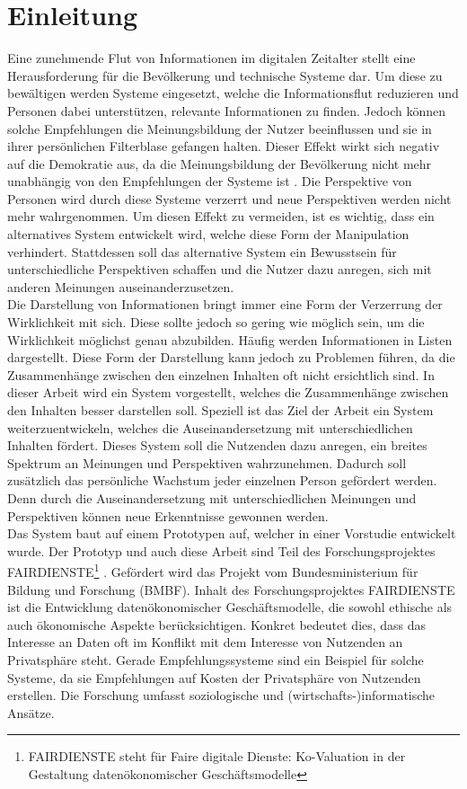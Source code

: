 \section{Einleitung}
Eine zunehmende Flut von Informationen im digitalen Zeitalter stellt eine Herausforderung für die Bevölkerung und technische Systeme dar.
Um diese zu bewältigen werden Systeme eingesetzt, welche die Informationsflut reduzieren und Personen dabei unterstützen, relevante Informationen zu finden.
Jedoch können solche Empfehlungen die Meinungsbildung der Nutzer beeinflussen und sie in ihrer persönlichen \glqq Filterblase\grqq{} gefangen halten.
Dieser Effekt wirkt sich negativ auf die Demokratie aus, da die Meinungsbildung der Bevölkerung nicht mehr unabhängig von den Empfehlungen der Systeme ist \cite{breaking-filter-bubble}.
Die Perspektive von Personen wird durch diese Systeme verzerrt und neue Perspektiven werden nicht mehr wahrgenommen.
Um diesen Effekt zu vermeiden, ist es wichtig, dass ein alternatives System entwickelt wird, welche diese Form der Manipulation verhindert.
Stattdessen soll das alternative System ein Bewusstsein für unterschiedliche Perspektiven schaffen und die Nutzer dazu anregen, sich mit anderen Meinungen auseinanderzusetzen. \\

Die Darstellung von Informationen bringt immer eine Form der Verzerrung der Wirklichkeit mit sich.
Diese sollte jedoch so gering wie möglich sein, um die Wirklichkeit möglichst genau abzubilden.
Häufig werden Informationen in Listen dargestellt.
Diese Form der Darstellung kann jedoch zu Problemen führen, da die Zusammenhänge zwischen den einzelnen Inhalten oft nicht ersichtlich sind.
In dieser Arbeit wird ein System vorgestellt, welches die Zusammenhänge zwischen den Inhalten besser darstellen soll.
Speziell ist das Ziel der Arbeit ein System weiterzuentwickeln, welches die Auseinandersetzung mit unterschiedlichen Inhalten fördert.
Dieses System soll die Nutzenden dazu anregen, ein breites Spektrum an Meinungen und Perspektiven wahrzunehmen.
Dadurch soll zusätzlich das persönliche Wachstum jeder einzelnen Person gefördert werden.
Denn durch die Auseinandersetzung mit unterschiedlichen Meinungen und Perspektiven können neue Erkenntnisse gewonnen werden. \\

Das System baut auf einem Prototypen auf, welcher in einer Vorstudie entwickelt wurde.
Der Prototyp und auch diese Arbeit sind Teil des Forschungsprojektes FAIRDIENSTE\footnote{FAIRDIENSTE steht für \glqq Faire digitale Dienste: Ko-Valuation in der Gestaltung datenökonomischer Geschäftsmodelle\grqq{}} \cite{fairdienste}.
Gefördert wird das Projekt vom Bundesministerium für Bildung und Forschung (BMBF).
Inhalt des Forschungsprojektes FAIRDIENSTE ist die Entwicklung datenökonomischer Geschäftsmodelle, die sowohl ethische als auch ökonomische Aspekte berücksichtigen.
Konkret bedeutet dies, dass das Interesse an Daten oft im Konflikt mit dem Interesse von Nutzenden an Privatsphäre steht.
Gerade Empfehlungssysteme sind ein Beispiel für solche Systeme, da sie Empfehlungen auf Kosten der Privatsphäre von Nutzenden erstellen.
Die Forschung umfasst soziologische und (wirtschafts-)informatische Ansätze. \\


